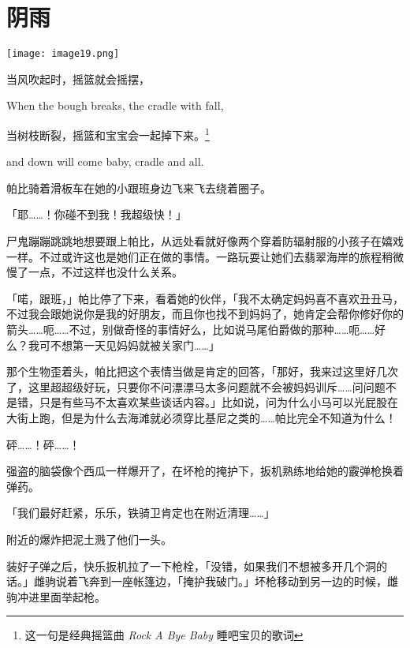 \chapter{阴雨}

\texttt{[image: image19.png]}

\begin{intro}
    当风吹起时，摇篮就会摇摆，
    
    When the bough breaks, the cradle with fall,

    \medskip

    当树枝断裂，摇篮和宝宝会一起掉下来。\footnote{这一句是经典摇篮曲 \emph{Rock A Bye Baby} 睡吧宝贝的歌词}

    and down will come baby, cradle and all.
\end{intro}


帕比骑着滑板车在她的小跟班身边飞来飞去绕着圈子。

「耶……！你碰不到我！我超级快！」

尸鬼蹦蹦跳跳地想要跟上帕比，从远处看就好像两个穿着防辐射服的小孩子在嬉戏一样。不过或许这也是她们正在做的事情。一路玩耍让她们去翡翠海岸的旅程稍微慢了一点，不过这样也没什么关系。

「喏，跟班，」帕比停了下来，看着她的伙伴，「我不太确定妈妈喜不喜欢丑丑马，不过我会跟她说你是我的好朋友，而且你也找不到妈妈了，她肯定会帮你修好你的箭头……呃……不过，别做奇怪的事情好么，比如说马尾伯爵做的那种……呃……好么？我可不想第一天见妈妈就被关家门……」

那个生物歪着头，帕比把这个表情当做是肯定的回答，「那好，我来过这里好几次了，这里超超级好玩，只要你不问漂漂马太多问题就不会被妈妈训斥……问问题不是错，只是有些马不太喜欢某些谈话内容。」比如说，问为什么小马可以光屁股在大街上跑，但是为什么去海滩就必须穿比基尼之类的……帕比完全不知道为什么！

\horizonline


砰……！砰……！

强盗的脑袋像个西瓜一样爆开了，在坏枪的掩护下，扳机熟练地给她的霰弹枪换着弹药。

「我们最好赶紧，乐乐，铁骑卫肯定也在附近清理……」

附近的爆炸把泥土溅了他们一头。

装好子弹之后，快乐扳机拉了一下枪栓，「没错，如果我们不想被多开几个洞的话。」雌驹说着飞奔到一座帐篷边，「掩护我破门。」坏枪移动到另一边的时候，雌驹冲进里面举起枪。


